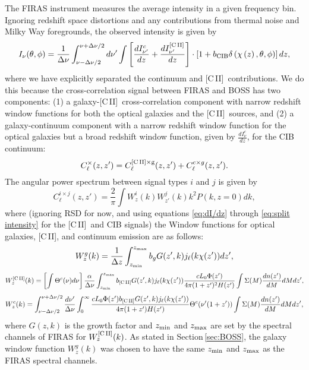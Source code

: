 \documentclass[fleqn,usenatbib]{mnras}
\newcommand{\cii}{[C{\sc\,II}]}
\begin{document}
The FIRAS instrument measures the average intensity in a given frequency bin. Ignoring redshift space distortions and any contributions from thermal noise and Milky Way foregrounds, the observed intensity is given by
\begin{equation}\label{eq:split intensity}
I_{\nu}(\theta, \phi) = \frac{1}{\Delta\nu}\int_{\nu - \Delta\nu/2}^{\nu + \Delta\nu/2}d\nu' \int \left[ \frac{dI^c_{\nu'}}{dz} + \frac{dI^{\rm \cii}_{\nu'}}{dz} \right] \cdot 
\left[1 + b_{\rm CIB}\delta\left( \chi \left( z \right),\theta,\phi \right) \right]dz,
\end{equation}
where we have explicitly separated the continuum and \cii\ contributions. We do this because the cross-correlation signal between FIRAS and BOSS has two components: (1) a galaxy-\cii\ cross-correlation component with narrow redshift window functions for both the optical galaxies and the \cii\ sources, and (2) a galaxy-continuum component with a narrow redshift window function for the optical galaxies but a broad redshift window function, given by $\frac{dI^c_{\nu}}{dz}$, for the CIB continuum:
\begin{equation}
C_{\ell}^{\times}(z,z') = C_{\ell}^{\rm \cii \times g}(z,z') + C_{\ell}^{c \times g}(z,z').
\end{equation}
The angular power spectrum between signal types $i$ and $j$ is given by
\begin{equation}
C_{\ell}^{i \times j}(z,z') = \frac{2}{\pi}\int W^i_z(k)W^j_{z'}(k)k^2 P(k,z=0) dk,
\end{equation}
where (ignoring RSD for now, and using equations \ref{eq:dI/dz} through \ref{eq:split intensity} for the \cii\ and CIB signals) the Window functions for optical galaxies, \cii, and continuum emission are as follows:
\begin{equation}
W^g_z(k) = \frac{1}{\Delta z} \int_{z_{\rm min}}^{z_{\rm max}}b_gG(z',k)j_{\ell}(k\chi(z'))dz', 
\end{equation}
\begin{equation*}
W^{\rm \cii}_z(k) = \left[\int\Theta^c(\nu)d\nu\right]\frac{\alpha}{\Delta \nu}\int_{z_{\rm min}}^{z_{\rm max}}b_{\rm \cii}G(z',k)j_{\ell}
(k\chi(z')) \frac{cL_0\Phi(z')}{4\pi(1+z')^2H(z')}\int\Sigma(M)\frac{dn(z')}{dM}dMdz', 
\end{equation*}
\begin{equation*}
W^c_z(k) = \int_{\nu - \Delta\nu/2}^{\nu + \Delta\nu/2} \frac{d{\nu'}}{\Delta \nu} \int_0^{\infty} \frac{cL_0\Phi(z')b_{\rm \cii}G(z',k)j_{\ell}
(k\chi(z'))}{4\pi(1+z')H(z')} \Theta^c(\nu'(1+z'))\int \Sigma(M)\frac{dn(z')}{dM}dMdz', 
\end{equation*}
where $G(z,k)$ is the growth factor and $z_{\rm min}$ and $z_{\rm max}$ are set by the spectral channels of FIRAS for $W^{\rm \cii}_z(k)$. As stated in Section\,\ref{sec:BOSS}, the galaxy window function $W^g_z(k)$ was chosen to have the same $z_{\rm min}$ and $z_{\rm max}$ as the FIRAS spectral channels.
\end{document}
